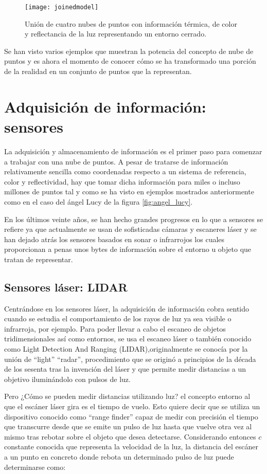 \begin{figure}
\centering
\texttt{[image: joinedmodel]}
\caption{Unión de cuatro nubes de puntos con información térmica, de color y reflectancia de la luz representando un entorno cerrado.}\label{fig:joined_model}
\end{figure}


Se han visto varios ejemplos que muestran la potencia del concepto de nube de puntos y es ahora el momento de conocer cómo se ha transformado una porción de la realidad en un conjunto de puntos que la representan.

\iffalse
\section{Adquisición de información: sensores}
La adquisición y almacenamiento de información es el primer paso para comenzar a trabajar con una nube de puntos. A pesar de tratarse de información relativamente sencilla como coordenadas respecto a un sistema de referencia, color y reflectividad, hay que tomar dicha información para miles o incluso millones de puntos tal y como se ha visto en ejemplos mostrados anteriormente como en el caso del ángel Lucy de la figura \ref{fig:angel_lucy}. 

En los últimos veinte años, se han hecho grandes progresos en lo que a sensores se refiere ya que actualmente se usan de sofisticadas cámaras y escaneres láser y se han dejado atrás los sensores basados en sonar o infrarrojos los cuales proporcionan a penas unos bytes de información sobre el entorno u objeto que tratan de representar.

\subsection{Sensores láser: LIDAR}
Centrándose en los sensores láser, la adquisición de información cobra sentido cuando se estudia el comportamiento de los rayos de luz ya sea visible o infrarroja, por ejemplo. Para poder llevar a cabo el escaneo de objetos tridimensionales así como entornos, se usa el escaneo láser o también conocido como Light Detection And Ranging (LIDAR),originalmente se conocía por la unión de ``light'' ``radar'', 
procedimiento que se originó a principios de la década de los sesenta tras la invención del láser y que permite medir distancias a un objetivo iluminándolo con pulsos de luz.

Pero ¿Cómo se pueden medir distancias utilizando luz?\cite{lidar} el concepto entorno al que el escáner láser gira es el tiempo de vuelo. Esto quiere decir que se utiliza un dispositivo conocido como ``range finder'' capaz de medir con precisión el tiempo que transcurre desde que se emite un pulso de luz hasta que vuelve otra vez al mismo tras rebotar sobre el objeto que desea detectarse. Considerando entonces $c$ constante conocida que representa la velocidad de la luz, la distancia del escáner a un punto en concreto donde rebota un determinado pulso de luz puede determinarse como:


